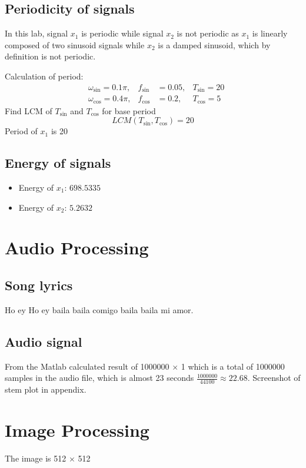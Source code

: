 \documentclass{article}
\begin{document}
\begin{multicols*}{2}
     \subsection{Periodicity of signals}
     In this lab, signal \(x_1\) is periodic while signal \(x_2\) is not periodic as \(x_1\) is linearly composed of two sinusoid signals while \(x_2\) is a damped sinusoid, which by definition is not periodic.

     Calculation of period:
     \begin{align*}
           & \omega_{\sin} = 0.1\pi, & f_{\sin} & = 0.05, & T_{\sin} = 20 \\
           & \omega_{\cos} = 0.4\pi, & f_{\cos} & = 0.2,  & T_{\cos} = 5
     \end{align*}
     Find LCM of  $T_{\sin}$ and  $T_{\cos}$ for base period
     \[LCM(T_{\sin}, T_{\cos})= 20\]
     Period of \(x_1\) is 20
     \subsection{Energy of signals}
     \begin{itemize}
          \item Energy of \(x_1\): \(698.5335\)
          \item Energy of \(x_2\): \(5.2632\)
     \end{itemize}

     \section{Audio Processing}
     \subsection{Song lyrics}
     Ho ey Ho ey baila baila comigo baila baila mi amor.
     \subsection{Audio signal}
     From the Matlab calculated result of 1000000 \(\times \) 1 which is a total of 1000000 samples in the audio file, which is almost 23 seconds \( \frac{1000000}{44100} \approx 22.68\). Screenshot of stem plot in appendix.
     \section{Image Processing}

     The image is 512 \(\times \) 512


\end{multicols*}
\end{document}
